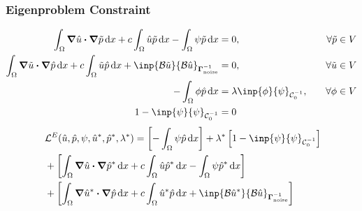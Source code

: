 \documentclass[
  pdf,
  10pt,
  xcolor={svgnames},
]{beamer}
\newcommand{\mc}[1]{\mathcal{#1}}
\newcommand{\mat}[1]{\mathbf{{#1}}}
\newcommand{\Gnoise}{\mat{\Gamma}_{\rm noise}}
\begin{document}
\begin{frame}
  \frametitle{Eigenproblem Constraint}
  \begin{align*}
    \int_\Omega \grad \hat{u} \vdot \grad \tilde{p} \dd{x}
    + c\int_\Omega \hat{u} \tilde{p} \dd{x}
    - \int_\Omega \psi \tilde{p} \dd{x}
     & = 0,
     & \quad \forall \tilde{p} \in V \\
    \int_\Omega \grad \tilde{u} \vdot \grad \hat{p} \dd{x}
    + c \int_\Omega \tilde{u} \hat{p} \dd{x}
    + \inp{\mc{B} \tilde{u}}{\mc{B}\hat{u}}_{\Gnoise^{-1}}
     & = 0,
     & \quad \forall \tilde{u} \in V \\
    -\int_\Omega \phi \hat{p} \dd{x}
     & =
    \lambda \inp{\phi}{\psi}_{\mc{C}_0^{-1}},
     & \quad \forall \phi \in V      \\
    1 - \inp{\psi}{\psi}_{\mc{C}_0^{-1}}
     & = 0
     &
  \end{align*}
  \pause
  \begin{align*}
     & ~ \mc{L}^E(\hat{u},\hat{p},\psi,\hat{u}^*,\hat{p}^*,\lambda^*)
    = \left[
      -\int_\Omega \psi \hat{p} \dd{x}
      \right]
    + \lambda^* \left[
    1 - \inp{\psi}{\psi}_{\mc{C}_0^{-1}}
    \right]                                                           \\
     & ~
    + \left[
      \int_\Omega \grad \hat{u} \vdot \grad \hat{p}^* \dd{x}
      + c\int_\Omega \hat{u} \hat{p}^* \dd{x}
      - \int_\Omega \psi \hat{p}^* \dd{x}
    \right]                                                           \\
     & ~
    + \left[
      \int_\Omega \grad \hat{u}^* \vdot \grad \hat{p} \dd{x}
      + c \int_\Omega \hat{u}^* \hat{p} \dd{x}
      + \inp{\mc{B} \hat{u}^*}{\mc{B}\hat{u}}_{\Gnoise^{-1}}
      \right]
  \end{align*}

\end{frame}
\end{document}
